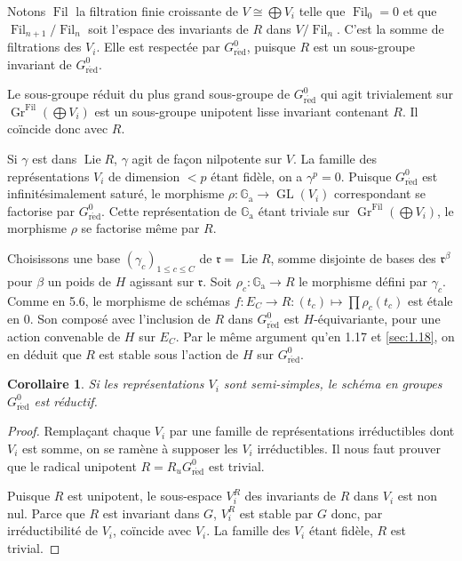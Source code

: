 \documentclass[11pt,a4paper]{article}
\theoremstyle{plain}
\newtheorem{corollary}[theorem]{Corollaire}
\theoremstyle{definition}
\DeclareMathOperator{\Lie}{Lie}
\DeclareMathOperator{\GL}{GL}
\DeclareMathOperator{\Fil}{Fil}
\DeclareMathOperator{\Gr}{Gr}
\newcommand{\Ga}{\mathbb{G}_\mathrm{a}}
\newcommand{\red}{\mathrm{r\acute{e}d}}
\begin{document}
Notons $\Fil$ la filtration finie croissante de $V \cong \bigoplus V_i$ telle que $\Fil_0 = 0$ et que $\Fil_{n+1}/\Fil_n$ soit l'espace des invariants de $R$ dans $V/\Fil_n$. C'est la somme de filtrations des $V_i$. Elle est respect\'ee par $G^0_\red$, puisque $R$ est un sous-groupe invariant de $G^0_\red$.

Le sous-groupe r\'eduit du plus grand sous-groupe de $G^0_\red$ qui agit trivialement sur $\Gr^{\Fil}(\bigoplus V_i)$ est un sous-groupe unipotent lisse invariant contenant $R$. Il co\"incide donc avec $R$.

Si $\gamma$ est dans $\Lie R$, $\gamma$ agit de fa\c{c}on nilpotente sur $V$. La famille des repr\'esentations $V_i$ de dimension $< p$ \'etant fid\`ele, on a $\gamma^p = 0$. Puisque $G^0_\red$ est infinit\'esimalement satur\'e, le morphisme $\rho: \Ga \to \GL(V_i)$ correspondant se factorise par $G^0_\red$. Cette repr\'esentation de $\Ga$ \'etant triviale sur $\Gr^{\Fil}(\bigoplus V_i)$, le morphisme $\rho$ se factorise m\^eme par $R$.

Choisissons une base $(\gamma_c)_{1 \leq c \leq C}$ de $\mathfrak{r} = \Lie R$, somme disjointe de bases des $\mathfrak{r}^\beta$ pour $\beta$ un poids de $H$ agissant sur $\mathfrak{r}$. Soit $\rho_c: \Ga \to R$ le morphisme d\'efini par $\gamma_c$. Comme en 5.6, le morphisme de sch\'emas $f: E_C \to R: (t_c) \mapsto \prod \rho_c(t_c)$ est \'etale en $0$. Son compos\'e avec l'inclusion de $R$ dans $G^0_\red$ est $H$-\'equivariante, pour une action convenable de $H$ sur $E_C$. Par le m\^eme argument qu'en 1.17 et \ref{sec:1.18}, on en d\'eduit que $R$ est stable sous l'action de $H$ sur $G^0_\red$.

\begin{corollary}\label{cor:1.24}
Si les repr\'esentations $V_i$ sont semi-simples, le sch\'ema en groupes $G^0_\red$ est r\'eductif.
\end{corollary}

\begin{proof}
Rempla\c{c}ant chaque $V_i$ par une famille de repr\'esentations irr\'eductibles dont $V_i$ est somme, on se ram\`ene \`a supposer les $V_i$ irr\'eductibles. Il nous faut prouver que le radical unipotent $R = R_u G^0_\red$ est trivial.

Puisque $R$ est unipotent, le sous-espace $V_i^R$ des invariants de $R$ dans $V_i$ est non nul. Parce que $R$ est invariant dans $G$, $V_i^R$ est stable par $G$ donc, par irr\'eductibilit\'e de $V_i$, co\"incide avec $V_i$. La famille des $V_i$ \'etant fid\`ele, $R$ est trivial.
\end{proof}
\end{document}
